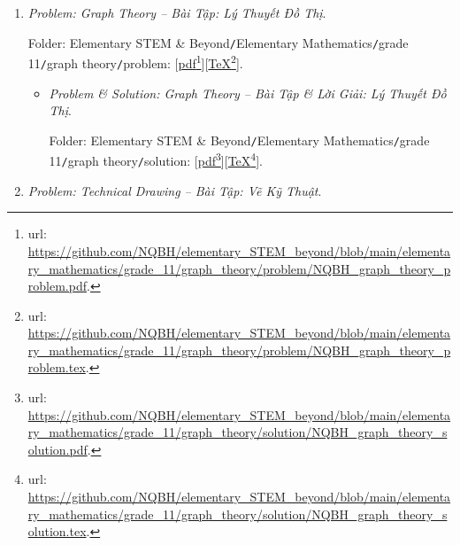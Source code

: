 \documentclass[12pt]{article}
\begin{document}
\begin{enumerate}
\begin{itemize}
		Folder: {\sf Elementary STEM \& Beyond{\tt/}Elementary Mathematics{\tt/}grade 11{\tt/}geometrical transformation{\tt/}solution}: [\href{https://github.com/NQBH/elementary_STEM_beyond/blob/main/elementary_mathematics/grade_11/geometrical_transformation/solution/NQBH_geometrical_transformation_solution.pdf}{pdf}\footnote{{\sc url}: \url{https://github.com/NQBH/elementary_STEM_beyond/blob/main/elementary_mathematics/grade_11/geometrical_transformation/solution/NQBH_geometrical_transformation_solution.pdf}.}][\href{https://github.com/NQBH/elementary_STEM_beyond/blob/main/elementary_mathematics/grade_11/geometrical_transformation/solution/NQBH_geometrical_transformation_solution.tex}{\TeX}\footnote{{\sc url}: \url{https://github.com/NQBH/elementary_STEM_beyond/blob/main/elementary_mathematics/grade_11/geometrical_transformation/solution/NQBH_geometrical_transformation_solution.tex}.}].		
	\end{itemize}
	\item {\it Problem: Graph Theory -- Bài Tập: Lý Thuyết Đồ Thị}.
	
	Folder: {\sf Elementary STEM \& Beyond{\tt/}Elementary Mathematics{\tt/}grade 11{\tt/}graph theory{\tt/}problem}: [\href{https://github.com/NQBH/elementary_STEM_beyond/blob/main/elementary_mathematics/grade_11/graph_theory/problem/NQBH_graph_theory_problem.pdf}{pdf}\footnote{{\sc url}: \url{https://github.com/NQBH/elementary_STEM_beyond/blob/main/elementary_mathematics/grade_11/graph_theory/problem/NQBH_graph_theory_problem.pdf}.}][\href{https://github.com/NQBH/elementary_STEM_beyond/blob/main/elementary_mathematics/grade_11/graph_theory/problem/NQBH_graph_theory_problem.tex}{\TeX}\footnote{{\sc url}: \url{https://github.com/NQBH/elementary_STEM_beyond/blob/main/elementary_mathematics/grade_11/graph_theory/problem/NQBH_graph_theory_problem.tex}.}].
	\begin{itemize}
		\item {\it Problem \& Solution: Graph Theory -- Bài Tập \& Lời Giải: Lý Thuyết Đồ Thị}.
		
		Folder: {\sf Elementary STEM \& Beyond{\tt/}Elementary Mathematics{\tt/}grade 11{\tt/}graph theory{\tt/}solution}: [\href{https://github.com/NQBH/elementary_STEM_beyond/blob/main/elementary_mathematics/grade_11/graph_theory/solution/NQBH_graph_theory_solution.pdf}{pdf}\footnote{{\sc url}: \url{https://github.com/NQBH/elementary_STEM_beyond/blob/main/elementary_mathematics/grade_11/graph_theory/solution/NQBH_graph_theory_solution.pdf}.}][\href{https://github.com/NQBH/elementary_STEM_beyond/blob/main/elementary_mathematics/grade_11/graph_theory/solution/NQBH_graph_theory_solution.tex}{\TeX}\footnote{{\sc url}: \url{https://github.com/NQBH/elementary_STEM_beyond/blob/main/elementary_mathematics/grade_11/graph_theory/solution/NQBH_graph_theory_solution.tex}.}].
	\end{itemize}
	\item {\it Problem: Technical Drawing -- Bài Tập: Vẽ Kỹ Thuật}.
	

\end{enumerate}
\end{document}
